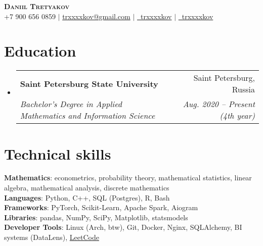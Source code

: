 \documentclass[a4paper, 11pt]{article}
\makeatletter
\newcommand{\resumeSubheading}[4]{
  \vspace{-2pt}\item
    \begin{tabular*}{0.97\textwidth}[t]{l@{\extracolsep{\fill}}r}
      \textbf{#1} & #2 \\
      \textit{\small#3} & \textit{\small #4} \\
    \end{tabular*}\vspace{-7pt}
}
\newcommand{\resumeSubHeadingListStart}{\begin{itemize}[leftmargin=0.15in, label={}]}
\newcommand{\resumeSubHeadingListEnd}{\end{itemize}}
\makeatother
\begin{document}
\begin{center}
    \textbf{\Huge \scshape Daniil Tretyakov} \\ \vspace{5pt}
    \small +7 900 656 0859 $|$ \href{mailto:trxxxxkov@gmail.com}{trxxxxkov@gmail.com} $|$ 
    \href{https://t.me/trxxxxkov}{\faTelegram \ trxxxxkov} $|$
    \href{https://github.com/trxxxxkov}{\faGithub \ trxxxxkov}
\end{center}


\section{Education}
  \resumeSubHeadingListStart
    \resumeSubheading
      {Saint Petersburg State University}{Saint Petersburg, Russia}
      {Bachelor's Degree in Applied Mathematics and Information Science}
      {Aug. 2020 -- Present (4th year)}
  \resumeSubHeadingListEnd


\section{Technical skills}
 \begin{itemize}[leftmargin=0.15in, label={}]
    \small{\item{
        \textbf{Mathematics}{: econometrics, probability theory, mathematical statistics, linear algebra, mathematical analysis, discrete mathematics} \\    
        \vspace{3pt}
        \textbf{Languages}{: Python, C++, SQL (Postgres), R, Bash} \\
        \vspace{3pt}
        \textbf{Frameworks}{: PyTorch, Scikit-Learn, Apache Spark, Aiogram} \\
        \vspace{3pt}
        \textbf{Libraries}{: pandas, NumPy, SciPy, Matplotlib, statsmodels} \\
        \vspace{3pt}
        \textbf{Developer Tools}{: Linux (Arch, btw), Git, Docker, Nginx, SQLAlchemy, BI systems (DataLens),  \href{https://leetcode.com/u/trxxxxkov/}{LeetCode}} \\
    }}
 \end{itemize}

\end{document}
